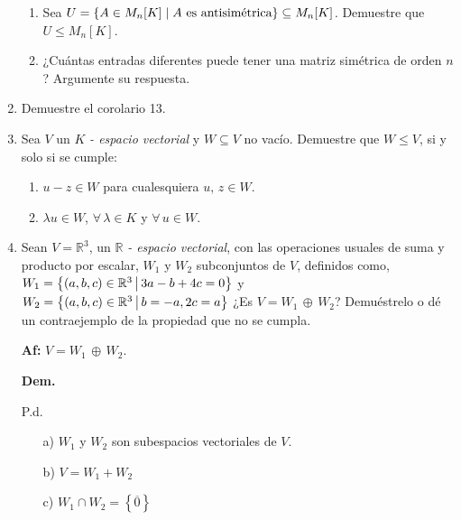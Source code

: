 \documentclass[fleqn]{article}
\begin{document}
\begin{enumerate}
\begin{enumerate}
            \item Sea $ U = \left \{A \in M_n [K] \; \middle \arrowvert \; A \text{ es antisimétrica} \right \} \subseteq M_n [K] $. Demuestre que $ U \leq M_n[K] $.
            
            \item ¿Cuántas entradas diferentes puede tener una matriz simétrica de orden $ n $? Argumente su respuesta.
        \end{enumerate}

        \item Demuestre el corolario 13.
        
        \item Sea $ V $ un $ K $ \textsl{- espacio vectorial} y $ W \subseteq V $ no vacío. Demuestre que $ W \leq V $, si y solo si se cumple:
        
        \begin{enumerate}
            \item $ u - z \in W $ para cualesquiera $ u, \, z \in W $.
            
            \item $ \lambda u \in W $, $ \forall \, \lambda \in K $ y $ \forall \, u \in W $.
        \end{enumerate}

        \item Sean $ V = \mathbb{R}^3 $, un $ \mathbb{R} $ \textsl{- espacio vectorial}, con las operaciones usuales de suma y producto por escalar, $ W_1 $ y $ W_2 $ subconjuntos de $ V $, definidos como, $ W_1 = \left \{(a,b,c) \in \mathbb{R}^3 \middle \arrowvert 3a - b + 4c = 0 \right \} $ y $ W_2 = \left \{(a,b,c) \in \mathbb{R}^3 \middle \arrowvert b=-a, 2c=a \right \} $ ¿Es $ V = W_1 \, \oplus \, W_2 $? Demuéstrelo o dé un contraejemplo de la propiedad que no se cumpla.
        
        \normalfont
        \textbf{Af:} $ V = W_1 \, \oplus \, W_2 $. \par

        \hspace{2.7mm}\textbf{Dem.} \par

        \begin{minipage}[c]{0.7cm}
            \vspace{-1.7cm} P.d. 
        \end{minipage} \begin{minipage}[b]{9cm}
            \begin{enumerate}
                \item[a)] $ W_1 $ y $ W_2 $ son subespacios vectoriales de $ V $. 
                \item[b)] $ V = W_1 + W_2 $
                \item[c)] $ W_1 \cap W_2 = \left \{\overline{0} \right \} $
            \end{enumerate}
        \end{minipage}
        

\end{enumerate}
\end{document}

